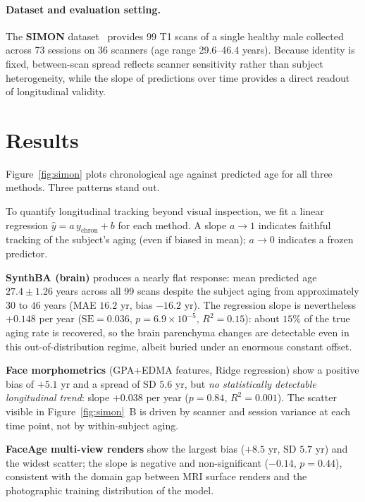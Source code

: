 \documentclass[11pt]{article}
\begin{document}
\paragraph{Dataset and evaluation setting.}
The \textbf{SIMON} dataset~\citep{duchesne2019simon} provides 99 T1 scans of a single
healthy male collected across 73 sessions on 36 scanners (age range
29.6--46.4 years).  Because identity is fixed, between-scan spread reflects
scanner sensitivity rather than subject heterogeneity, while the slope of
predictions over time provides a direct readout of longitudinal validity.

\section{Results}

Figure~\ref{fig:simon} plots chronological age against predicted age for all
three methods.  Three patterns stand out.

To quantify longitudinal tracking beyond visual inspection, we fit a
linear regression $\hat{y} = a\,y_{\text{chron}} + b$ for each method.
A slope $a{\to}1$ indicates faithful tracking of the subject's aging
(even if biased in mean); $a{\to}0$ indicates a frozen predictor.

\textbf{SynthBA (brain)} produces a nearly flat response: mean predicted
age $27.4 \pm 1.26$ years across all 99 scans despite the subject aging
from approximately $30$ to $46$ years (MAE $16.2$ yr, bias $-16.2$ yr).
The regression slope is nevertheless $+0.148$ per year
($\mathrm{SE}{=}0.036$, $p{=}6.9\times 10^{-5}$, $R^{2}{=}0.15$): about
$15\%$ of the true aging rate is recovered, so the brain parenchyma
changes are detectable even in this out-of-distribution regime, albeit
buried under an enormous constant offset.

\textbf{Face morphometrics} (GPA+EDMA features, Ridge regression) show a
positive bias of $+5.1$ yr and a spread of SD $5.6$ yr, but \emph{no
statistically detectable longitudinal trend}: slope $+0.038$ per year
($p{=}0.84$, $R^{2}{=}0.001$).  The scatter visible in
Figure~\ref{fig:simon}~B is driven by scanner and session variance at
each time point, not by within-subject aging.

\textbf{FaceAge multi-view renders} show the largest bias ($+8.5$ yr,
SD $5.7$ yr) and the widest scatter; the slope is negative and
non-significant ($-0.14$, $p{=}0.44$), consistent with the domain gap
between MRI surface renders and the photographic training distribution
of the model.
\end{document}
